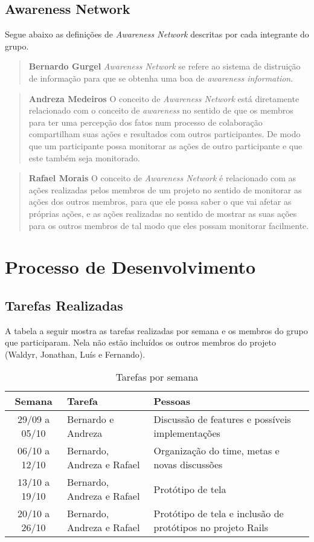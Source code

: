 \documentclass{acm_proc_article-sp}
\begin{document}
\subsection{Awareness Network}
Segue abaixo as definições de \textsl{Awareness Network} descritas por cada integrante do grupo.

\begin{quote}\textbf{Bernardo Gurgel}
\textsl{Awareness Network} se refere ao sistema de distruição de informação para que se obtenha uma boa de \textsl{awareness information}.
\end{quote}

\begin{quote}\textbf{Andreza Medeiros}
O conceito de \textsl{Awareness Network} está diretamente relacionado com o conceito de \textsl{awareness} no sentido de que os membros para ter uma percepção dos fatos num processo de colaboração compartilham suas ações e resultados com outros participantes. De modo que um participante possa monitorar as ações de outro participante e que este também seja monitorado. 
\end{quote}

\begin{quote}\textbf{Rafael Morais}
  O conceito de \textsl{Awareness Network} é relacionado com as ações realizadas pelos membros de um projeto no sentido de
  monitorar as ações dos outros membros, para que ele possa saber o que vai afetar as próprias ações, e as ações realizadas no sentido de
  mostrar as suas ações para os outros membros de tal modo que eles possam monitorar facilmente.
\end{quote}

\section{Processo de Desenvolvimento}
\subsection{Tarefas Realizadas}
A tabela a seguir mostra as tarefas realizadas por semana e os membros do grupo que participaram.
Nela não estão incluídos os outros membros do projeto (Waldyr, Jonathan, Luís e Fernando).

\begin{table}[h]
  \caption{Tarefas por semana}
  \begin{tabular}{|cp{3cm}p{3cm}|}
    \hline
    Semana&Tarefa&Pessoas\\
    \hline
    29/09 a 05/10&Bernardo e Andreza&Discussão de features e possíveis implementações\\
    06/10 a 12/10&Bernardo, Andreza e Rafael&Organização do time, metas e novas discussões\\
    13/10 a 19/10&Bernardo, Andreza e Rafael&Protótipo de tela\\
    20/10 a 26/10&Bernardo, Andreza e Rafael&Protótipo de tela e inclusão de protótipos no projeto Rails\\
    \hline
  \end{tabular}
\end{table}
\end{document}
